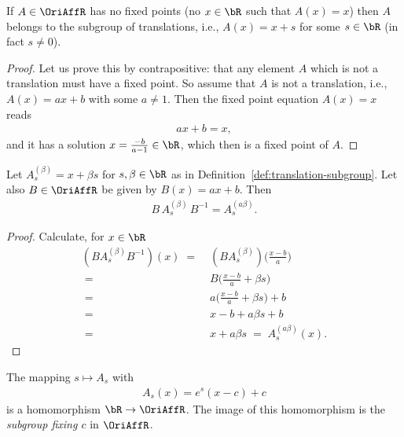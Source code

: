 \begin{lemma}
  \label{lem:no-fixed-point-implies-translation}
  \leanok
  If $A \in \OriAffR$ has no fixed points (no $x \in \bR$ such that $A(x) = x$)
  then $A$ belongs to the subgroup of translations, i.e., $A(x) = x + s$
  for some $s \in \bR$ (in fact $s \ne 0$).
\end{lemma}
\begin{proof}
  Let us prove this by contrapositive: that any element $A$ which is not a
  translation must have a fixed point.
  So assume that $A$ is not a translation, i.e.,
  $A(x) = a x + b$ with some $a \ne 1$. Then the fixed point equation
  $A(x) = x$ reads
  \begin{align*}
    a x + b = x  ,
  \end{align*}
  and it has a solution $x = \frac{-b}{a-1} \in \bR$, which then is a
  fixed point of $A$.
\end{proof}

\begin{lemma}
  \label{lem:conjugate-translation}
  Let $A^{(\beta)}_s = x + \beta s$ for $s, \beta \in \bR$ as in
  Definition~\ref{def:translation-subgroup}. Let
  also $B \in \OriAffR$ be given by $B(x) = a x + b$. Then
  \begin{align*}
    B \, A^{(\beta)}_s \, B^{-1} = A^{(a \beta)}_{s} .
  \end{align*}
\end{lemma}
\begin{proof}
  Calculate, for $x \in \bR$
  \begin{align*}
    (B A^{(\beta)}_s B^{-1})(x) \; = \; & (B A^{(\beta)}_s)\big( \frac{x-b}{a} \big) \\
    \; = \; & B\big( \frac{x-b}{a} + \beta s \big) \\
    \; = \; & a \big( \frac{x-b}{a} + \beta s \big) + b \\
    \; = \; & x - b + a \beta s + b \\
    \; = \; & x + a \beta s \; = \; A^{(a \beta)}_s(x).
  \end{align*}
\end{proof}

\begin{definition}
  \label{def:fixing-subgroup}
  The mapping $s \mapsto A_s$ with
  \begin{align*}
    A_s(x) = e^{s} (x - c) + c
  \end{align*}
  is a homomorphism $\bR \to \OriAffR$. The image of this
  homomorphism is the \emph{subgroup fixing $c$} in $\OriAffR$.
\end{definition}

